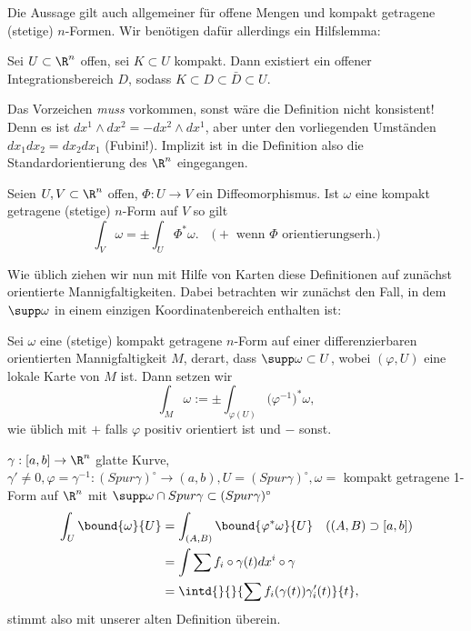 Die Aussage gilt auch allgemeiner für offene Mengen und kompakt getragene (stetige) $n$-Formen. Wir benötigen dafür allerdings ein Hilfslemma:

\begin{lem}\autolabel
	Sei \( U \subset \R^n \) offen, sei $K \subset U$ kompakt. Dann existiert ein offener Integrationsbereich $D$, sodass $K \subset D \subset \bar{D} \subset U$.
\end{lem}

\begin{rem*}
	Das Vorzeichen \emph{muss} vorkommen, sonst wäre die Definition nicht konsistent! Denn es ist \( dx^1 \wedge dx^2 = -dx^2 \wedge dx^1 \), aber unter den vorliegenden Umständen \( dx_1dx_2 = dx_2dx_1 \) (Fubini!). Implizit ist in die Definition also die Standardorientierung des $\R^n$ eingegangen.
\end{rem*}

\begin{lem}\autolabel
	Seien \( U,V \subset \R^n \) offen, \( \Phi: U \to V \) ein Diffeomorphismus. Ist $\omega$ eine kompakt getragene (stetige) $n$-Form auf $V$ so gilt
	\[ \int_V \omega = \pm \int_U \Phi^*\omega.\quad \text{($+$ wenn $\Phi$ orientierungserh.)} \]
\end{lem}

Wie üblich ziehen wir nun mit Hilfe von Karten diese Definitionen auf zunächst orientierte Mannigfaltigkeiten. Dabei betrachten wir zunächst den Fall, in dem $\supp \omega$ in einem einzigen Koordinatenbereich enthalten ist:

\begin{defn}\autolabel
	Sei $\omega$ eine (stetige) kompakt getragene $n$-Form auf einer differenzierbaren orientierten Mannigfaltigkeit $M$, derart, dass $\supp \omega \subset U$, wobei \( (\varphi,U) \) eine lokale Karte von $M$ ist. Dann setzen wir 
	\[ \int_M \omega := \pm \int_{\varphi(U)} \big(\varphi^{-1}\big)^* \omega, \]
	wie üblich mit $+$ falls $\varphi$ positiv orientiert ist und $-$ sonst.
\end{defn}

\begin{exmp*}
	\( \gamma: [a,b] \to \R^n \) glatte Kurve, \( \gamma' \neq 0, \varphi= \gamma^{-1}: (Spur \gamma)^\circ \to (a,b), U = (Spur \gamma)^\circ, \omega =  \) kompakt getragene 1-Form auf $\R^n$ mit $\supp \omega \cap Spur \gamma \subset (Spur \gamma)^\circ$
	\begin{align*}
		\int_U \bound{\omega}{U} &= \int_{(A,B)} \bound{\varphi^*\omega}{U} \quad ((A,B) \supset [a,b])\\
		&= \int \sum f_i \circ \gamma(t) dx^i \circ \gamma\\
		&= \intd{}{}{\sum f_i(\gamma(t)) \gamma_i' (t)}{t},
	\end{align*}
	stimmt also mit unserer alten Definition überein.
\end{exmp*}

